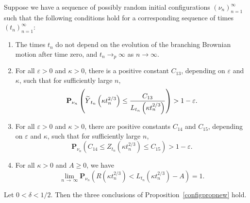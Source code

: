 \documentclass[AHL,Unicode,longabstracts,published]{cedram}
\newcommand*\eps{\varepsilon}
\renewcommand*\P{\mathbf{P}}
\newcommand{\1} {\mathds{1}}
\let\oldtilde\tilde
\renewcommand*{\tilde}[1]{\mathchoice{\widetilde{#1}}{\widetilde{#1}}{\oldtilde{#1}}{\oldtilde{#1}}}
\begin{document}
\begin{lemm}\label{configlemma}
Suppose we have a sequence of possibly random initial configurations $(\nu_n)_{n=1}^{\infty}$ such that the following conditions hold for a corresponding sequence of times $(t_n)_{n=1}^{\infty}$:
\begin{enumerate}
\item\label{lemm6.1-1} The times $t_n$ do not depend on the evolution of the branching Brownian motion after time zero, and $t_n \rightarrow_p \infty$ as $n \rightarrow \infty$.

\item\label{lemm6.1-2} For all $\eps > 0$ and $\kappa > 0$, there is a positive constant $C_{13}$, depending on $\eps$ and $\kappa$, such that for sufficiently large $n$,
\begin{equation}\label{configasm2}
\P_{\nu_n} \left({\tilde Y}_{t_n}\left(\kappa t_n^{2/3}\right) \leq \frac{C_{13}}{L_{t_n}\left(\kappa t_n^{2/3}\right)} \right) > 1 - \eps.
\end{equation}

\item\label{lemm6.1-3} For all $\eps > 0$ and $\kappa > 0$, there are positive constants $C_{14}$ and $C_{15}$, depending on $\eps$ and $\kappa$, such that for sufficiently large $n$,
\begin{equation}\label{configasm3}
\P_{\nu_n}\left(C_{14} \leq Z_{t_n}\left(\kappa t_n^{2/3}\right) \leq C_{15}\right) > 1 - \eps.
\end{equation}

\item\label{lemm6.1-4} For all $\kappa > 0$ and $A \geq 0$, we have
\begin{equation}\label{configasm4}
\lim_{n\,\rightarrow\,\infty} \P_{\nu_n}\left(R\left(\kappa t_n^{2/3}\right) < L_{t_n}\left(\kappa t_n^{2/3}\right) - A \right) = 1.
\end{equation}
\end{enumerate}
Let $0 < \delta < 1/2$. Then the three conclusions of Proposition~\ref{configpropnew} hold.
\end{lemm}
\end{document}
